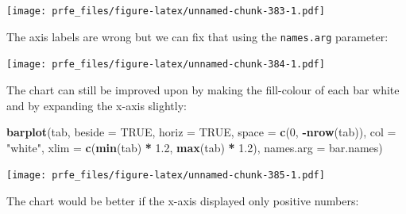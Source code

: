 \documentclass[12pt,a4paper]{book}
\newenvironment{Shaded}{\begin{snugshade}}{\end{snugshade}}
\newcommand{\DataTypeTok}[1]{\textcolor[rgb]{0.13,0.29,0.53}{#1}}
\newcommand{\DecValTok}[1]{\textcolor[rgb]{0.00,0.00,0.81}{#1}}
\newcommand{\FloatTok}[1]{\textcolor[rgb]{0.00,0.00,0.81}{#1}}
\newcommand{\KeywordTok}[1]{\textcolor[rgb]{0.13,0.29,0.53}{\textbf{#1}}}
\newcommand{\NormalTok}[1]{#1}
\newcommand{\OperatorTok}[1]{\textcolor[rgb]{0.81,0.36,0.00}{\textbf{#1}}}
\newcommand{\OtherTok}[1]{\textcolor[rgb]{0.56,0.35,0.01}{#1}}
\newcommand{\StringTok}[1]{\textcolor[rgb]{0.31,0.60,0.02}{#1}}
\theoremstyle{definition}
\theoremstyle{definition}
\theoremstyle{definition}
\theoremstyle{remark}
\begin{document}
\texttt{[image: prfe\_files/figure-latex/unnamed-chunk-383-1.pdf]}

The axis labels are wrong but we can fix that using the
\texttt{names.arg} parameter:

\begin{Shaded}
\end{Shaded}

\texttt{[image: prfe\_files/figure-latex/unnamed-chunk-384-1.pdf]}

The chart can still be improved upon by making the fill-colour of each
bar white and by expanding the x-axis slightly:

\begin{Shaded}
\begin{Highlighting}[]
\KeywordTok{barplot}\NormalTok{(tab, }\DataTypeTok{beside =} \OtherTok{TRUE}\NormalTok{, }\DataTypeTok{horiz =} \OtherTok{TRUE}\NormalTok{, }\DataTypeTok{space =} \KeywordTok{c}\NormalTok{(}\DecValTok{0}\NormalTok{, }\OperatorTok{-}\KeywordTok{nrow}\NormalTok{(tab)),}
        \DataTypeTok{col =} \StringTok{"white"}\NormalTok{, }\DataTypeTok{xlim =} \KeywordTok{c}\NormalTok{(}\KeywordTok{min}\NormalTok{(tab) }\OperatorTok{*}\StringTok{ }\FloatTok{1.2}\NormalTok{, }\KeywordTok{max}\NormalTok{(tab) }\OperatorTok{*}\StringTok{ }\FloatTok{1.2}\NormalTok{),}
        \DataTypeTok{names.arg =}\NormalTok{ bar.names)}
\end{Highlighting}
\end{Shaded}

\texttt{[image: prfe\_files/figure-latex/unnamed-chunk-385-1.pdf]}

The chart would be better if the x-axis displayed only positive numbers:
\end{document}
